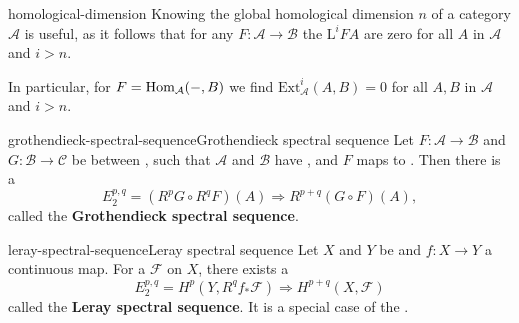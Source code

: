 \begin{example}{homological-dimension}
    Knowing the global homological dimension $n$ of a category $\mathcal{A}$ is useful, as it follows that for any  $F : \mathcal{A} \to \mathcal{B}$ the  $\text{L}^i F A$ are zero for all $A$ in $\mathcal{A}$ and $i > n$.
    
    In particular, for $F = \text{Hom}_\mathcal{A}(-, B)$ we find $\text{Ext}_\mathcal{A}^i(A, B) = 0$ for all $A, B$ in $\mathcal{A}$ and $i > n$.
\end{example}

\begin{topic}{grothendieck-spectral-sequence}{Grothendieck spectral sequence}
    Let $F : \mathcal{A} \to \mathcal{B}$ and $G : \mathcal{B} \to \mathcal{C}$ be  between , such that $\mathcal{A}$ and $\mathcal{B}$ have , and $F$ maps  to . Then there is a 
    \[ E_2^{p, q} = (R^p G \circ R^q F)(A) \Rightarrow R^{p + q}(G \circ F)(A) , \]
    called the \textbf{Grothendieck spectral sequence}.
\end{topic}

\begin{topic}{leray-spectral-sequence}{Leray spectral sequence}
    Let $X$ and $Y$ be  and $f : X \to Y$ a continuous map. For a  $\mathcal{F}$ on $X$, there exists a 
    \[ E_2^{p, q} = H^p(Y, R^q f_* \mathcal{F}) \Rightarrow H^{p + q}(X, \mathcal{F}) \]
    called the \textbf{Leray spectral sequence}. It is a special case of the .
\end{topic}

